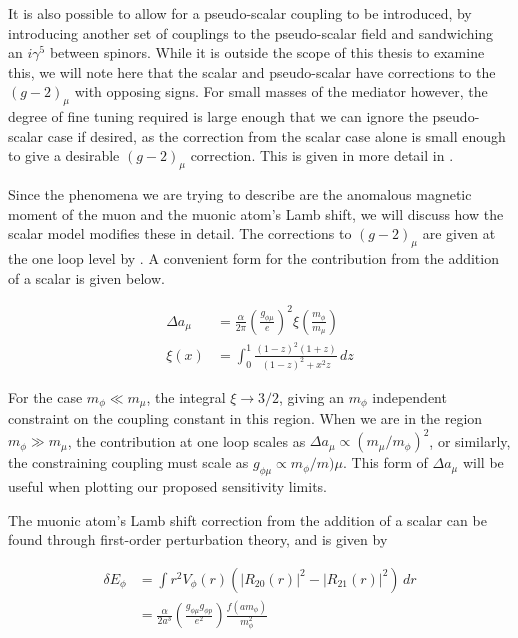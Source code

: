 It is also possible to allow for a pseudo-scalar coupling to be introduced, by introducing another set of couplings to the pseudo-scalar field and sandwiching an $i\gamma^5$ between spinors.
While it is outside the scope of this thesis to examine this, we will note here that the scalar and pseudo-scalar have corrections to the $(g-2)_\mu$ with opposing signs.
For small masses of the mediator however, the degree of fine tuning required is large enough that we can ignore the pseudo-scalar case if desired, as the correction from the scalar case alone is small enough to give a desirable $(g-2)_\mu$ correction.
This is given in more detail in \cite{Carlson:2015jba}.

Since the phenomena we are trying to describe are the anomalous magnetic moment of the muon and the muonic atom's Lamb shift, we will discuss how the scalar model modifies these in detail.
The corrections to $(g-2)_\mu$ are given at the one loop level by \cite{Leveille:1977rc, McKeen:2009ny, TuckerSmith:2010ra}.
A convenient form for the contribution from the addition of a scalar is given below.

\begin{align}
    \Delta a_\mu &= \frac{\alpha}{2\pi} \left(\frac{g_{\phi\mu}}{e}\right)^2 \xi\left(\frac{m_\phi}{m_\mu}\right) \\
    \xi(x) &= \int_0^1 \frac{(1-z)^2(1+z)}{(1-z)^2 + x^2z} \,dz
\end{align}

\noindent For the case $m_\phi \ll m_\mu$, the integral $\xi \rightarrow 3/2$, giving an $m_\phi$ independent constraint on the coupling constant in this region.
When we are in the region $m_\phi \gg m_\mu$, the contribution at one loop scales as $\Delta a_\mu \propto (m_\mu/m_\phi)^2$, or similarly, the constraining coupling must scale as $g_{\phi\mu} \propto m_\phi / m)\mu$.
This form of $\Delta a_\mu$ will be useful when plotting our proposed sensitivity limits.

The muonic atom's Lamb shift correction from the addition of a scalar can be found through first-order perturbation theory, and is given by \cite{TuckerSmith:2010ra, Carlson:2015jba}

\begin{align}
    \delta E_\phi &= \int r^2 V_\phi(r)\left(\left|R_{20}(r)\right|^2 - \left|R_{21}(r)\right|^2\right)\,dr \\
                  &= \frac{\alpha}{2 a^3} \left(\frac{g_{\phi\mu} g_{\phi p}}{e^2}\right) \frac{f(a m_\phi)}{m_\phi^2}
\end{align}

